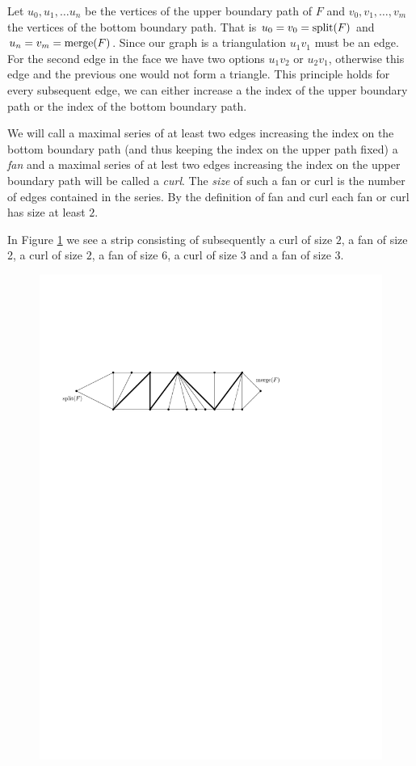  Let $u_0 , u_1, \ldots u_n$ be the vertices of the upper boundary path of $F$ and $v_0, v_1, \ldots, v_m$ the vertices of the bottom boundary path. That is $u_0=v_0 = \operatorname{split}(F)$ and $u_n = v_m = \operatorname{merge}(F)$. Since our graph is a triangulation $u_1v_1$ must be an edge. For the second edge in the face we have two options $u_1v_2$ or $u_2v_1$, otherwise this edge and the previous one would not form a triangle. This principle holds for every subsequent edge, we can either increase a the index of the upper boundary path or the index of the bottom boundary path.

 We will call a maximal series of at least two edges increasing the index on the bottom boundary path (and thus keeping the index on the upper path fixed) a \emph{fan} and a maximal series of at lest two edges increasing the index on the upper boundary path will be called a \emph{curl}. The \emph{size} of such a fan or curl is the number of edges contained in the series. By the definition of fan and curl each fan or curl has size at least $2$.

 In Figure \ref{fig:uni:fansandcurls} we see a strip consisting of subsequently a curl of size $2$, a fan of size 2, a curl of size $2$, a fan of size $6$, a curl of size $3$ and a fan of size $3$.

 \begin{figure}[h]
   \centering
   \includegraphics[scale=.9]{unifiedAlgo/img/fansandcurls}
   \caption{}
   \label{fig:uni:fansandcurls}
 \end{figure}


